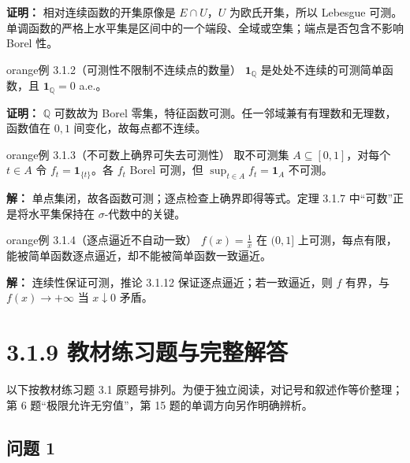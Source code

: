 \documentclass[11pt,a4paper]{article}
\begin{document}
\textbf{证明：} 相对连续函数的开集原像是 \(E\cap U\)，\(U\)
为欧氏开集，所以 Lebesgue
可测。单调函数的严格上水平集是区间中的一个端段、全域或空集；端点是否包含不影响
Borel 性。

\begin{sboxenv}{orange}{例 3.1.2（可测性不限制不连续点的数量）}
\(\mathbf1_{\mathbb Q}\) 是处处不连续的可测简单函数，且
\(\mathbf1_{\mathbb Q}=0\) a.e.。

\end{sboxenv}

\textbf{证明：} \(\mathbb Q\) 可数故为 Borel
零集，特征函数可测。任一邻域兼有有理数和无理数，函数值在 \(0,1\)
间变化，故每点都不连续。

\begin{sboxenv}{orange}{例 3.1.3（不可数上确界可失去可测性）}
取不可测集 \(A\subseteq[0,1]\)，对每个 \(t\in A\) 令
\(f_t=\mathbf1_{\{t\}}\)。各 \(f_t\) Borel 可测，但
\(\sup_{t\in A}f_t=\mathbf1_A\) 不可测。

\end{sboxenv}

\textbf{解：} 单点集闭，故各函数可测；逐点检查上确界即得等式。定理 3.1.7
中``可数''正是将水平集保持在 \(\sigma\)-代数中的关键。

\begin{sboxenv}{orange}{例 3.1.4（逐点逼近不自动一致）}
\(f(x)=\frac1x\) 在 \((0,1]\)
上可测，每点有限，能被简单函数逐点逼近，却不能被简单函数一致逼近。

\end{sboxenv}

\textbf{解：} 连续性保证可测，推论 3.1.12 保证逐点逼近；若一致逼近，则
\(f\) 有界，与 \(f(x)\to+\infty\) 当 \(x\downarrow0\) 矛盾。

\section[\S{}3.1.9
教材练习题与完整解答]{3.1.9
教材练习题与完整解答}\label{ux6559ux6750ux7ec3ux4e60ux9898ux4e0eux5b8cux6574ux89e3ux7b54}

以下按教材练习题 3.1
原题号排列。为便于独立阅读，对记号和叙述作等价整理；第 6
题``极限允许无穷值''，第 15 题的单调方向另作明确辨析。

\subsection{问题 1}\label{ux95eeux9898-1}
\end{document}
